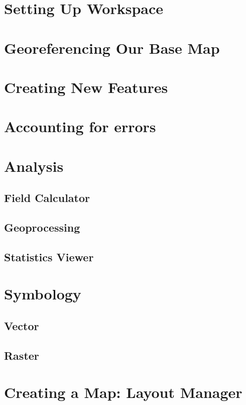 \documentclass{article}
\begin{document}
\section{Setting Up Workspace}



\section{Georeferencing Our Base Map}

\section{Creating New Features}

\section{Accounting for errors}

\section{Analysis}

\subsection{Field Calculator}

\subsection{Geoprocessing}

\subsection{Statistics Viewer}

\section{Symbology}

\subsection{Vector}

\subsection{Raster}

\section{Creating a Map: Layout Manager}
\end{document}
